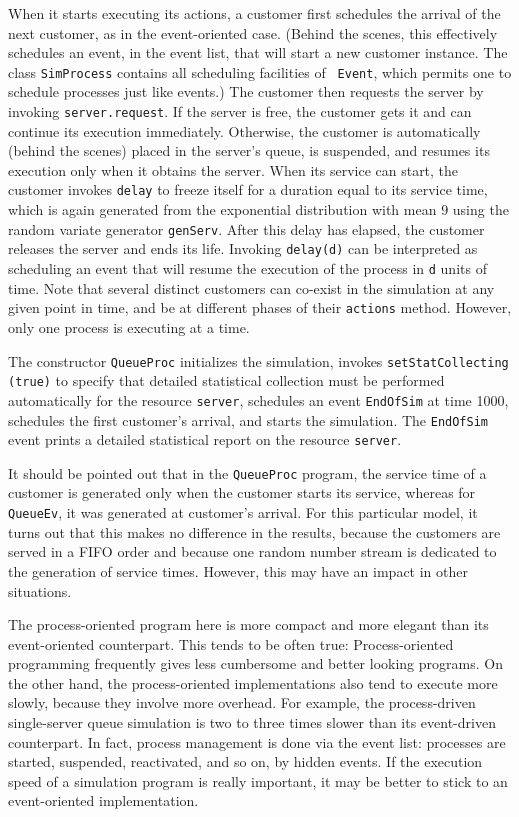 When it starts executing its actions, a customer first schedules
the arrival of the next customer, as in the event-oriented case.
(Behind the scenes, this effectively schedules an event, in the
event list, that will start a new customer instance.
The class \texttt{SimProcess} contains all scheduling facilities of {\tt
  Event}, which permits one
to schedule processes just like events.)
The customer then requests the server by invoking \texttt{server.request}.
If the server is free, the customer gets it and can continue its
execution immediately.  Otherwise, the customer is automatically 
(behind the scenes) placed in the server's queue, is suspended, 
and resumes its execution only when it obtains the server.
When its service can start, the customer invokes \texttt{delay} to 
freeze itself for a duration equal to its service time, which is
again generated from the exponential distribution with mean 9
using the random variate generator \texttt{genServ}.  
After this delay has elapsed, the customer
releases the server and ends its life.
Invoking \texttt{delay(d)} can be interpreted as scheduling an event that
will resume the execution of the process in \texttt{d} units of time.
Note that several distinct customers can 
co-exist in the simulation at any given point in time, and
be at different phases of their \texttt{actions} method.
However, only one process is executing at a time.

The constructor \texttt{QueueProc} initializes the simulation,
invokes \texttt{setStatCollecting (true)} to specify that detailed statistical
collection must be performed automatically for the resource \texttt{server}, 
schedules an event \texttt{EndOfSim} at time 1000,
schedules the first customer's arrival, and starts the simulation.
The \texttt{EndOfSim} event prints a detailed statistical report on 
the resource \texttt{server}.

It should be pointed out that in the \texttt{QueueProc} program,
the service time of a customer is generated
only when the customer starts its service, whereas for \texttt{QueueEv},
it was generated at customer's arrival.
For this particular model, it turns out that this makes no difference 
in the results, because the customers are served in a FIFO order
and because one random number stream is dedicated to the generation
of service times. 
However, this may have an impact in other situations.

The process-oriented program here is more compact and
more elegant than its event-oriented counterpart.
This tends to be often true: Process-oriented programming 
frequently gives less cumbersome and better looking programs.
On the other hand, the process-oriented implementations also tend to
execute more slowly, because they involve more overhead.
For example, the process-driven single-server queue simulation
is two to three times slower than its event-driven counterpart.
In fact, process management is done via the event list:
processes are started, suspended, reactivated, and so on, 
by hidden events.
If the execution speed of a simulation program is really important,
it may be better to stick to an event-oriented implementation.


